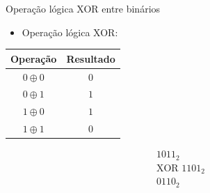 

\begin{frame}{Operação lógica XOR entre binários}
    \begin{itemize}
        \item Operação lógica XOR:
    \end{itemize}

    \begin{table}[h]
        \centering
        \begin{tabular}{c|c}
            \hline
            \textbf{Operação} & \textbf{Resultado} \\
            \hline
            $0 \oplus 0$ & $0$ \\
            $0 \oplus 1$ & $1$ \\
            $1 \oplus 0$ & $1$ \\
            $1 \oplus 1$ & $0$ \\
            \hline
        \end{tabular}
    \end{table}

    \[
    \begin{array}{r}
          1011_{2} \\
        \text{XOR }1101_{2} \\
        \hline
          0110_{2}
    \end{array}
    \]

\end{frame}

